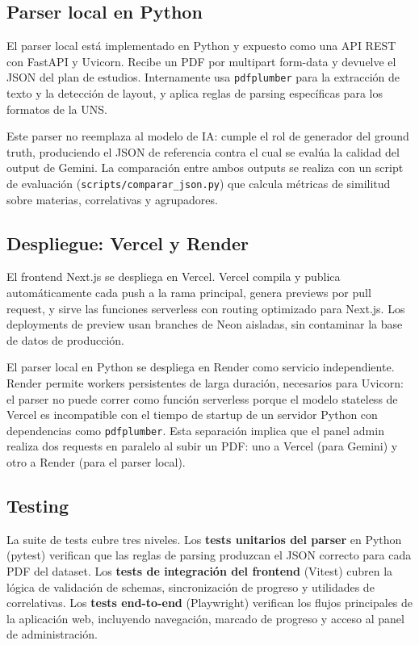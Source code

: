 \documentclass[12pt, a4paper]{report}
\begin{document}
\subsection{Parser local en Python}

El parser local está implementado en Python y expuesto como una API REST con FastAPI y
Uvicorn. Recibe un PDF por multipart form-data y devuelve el JSON del plan de estudios.
Internamente usa \texttt{pdfplumber} para la extracción de texto y la detección de layout,
y aplica reglas de parsing específicas para los formatos de la UNS.

Este parser no reemplaza al modelo de IA: cumple el rol de generador del ground truth,
produciendo el JSON de referencia contra el cual se evalúa la calidad del output de Gemini.
La comparación entre ambos outputs se realiza con un script de evaluación
(\texttt{scripts/comparar\_json.py}) que calcula métricas de similitud sobre materias,
correlativas y agrupadores.

\subsection{Despliegue: Vercel y Render}

El frontend Next.js se despliega en Vercel. Vercel compila y publica automáticamente cada
push a la rama principal, genera previews por pull request, y sirve las funciones
serverless con routing optimizado para Next.js. Los deployments de preview usan branches
de Neon aisladas, sin contaminar la base de datos de producción.

El parser local en Python se despliega en Render como servicio independiente. Render
permite workers persistentes de larga duración, necesarios para Uvicorn: el parser no
puede correr como función serverless porque el modelo stateless de Vercel es incompatible
con el tiempo de startup de un servidor Python con dependencias como \texttt{pdfplumber}.
Esta separación implica que el panel admin realiza dos requests en paralelo al subir un
PDF: uno a Vercel (para Gemini) y otro a Render (para el parser local).

\subsection{Testing}

La suite de tests cubre tres niveles. Los \textbf{tests unitarios del parser} en Python
(pytest) verifican que las reglas de parsing produzcan el JSON correcto para cada PDF del
dataset. Los \textbf{tests de integración del frontend} (Vitest) cubren la lógica de
validación de schemas, sincronización de progreso y utilidades de correlativas. Los
\textbf{tests end-to-end} (Playwright) verifican los flujos principales de la aplicación
web, incluyendo navegación, marcado de progreso y acceso al panel de administración.
\end{document}
